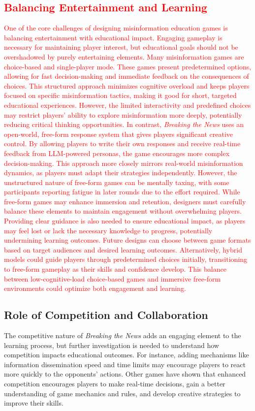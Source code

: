 \textcolor{red}{\subsection{Balancing Entertainment and Learning}
One of the core challenges of designing misinformation education games is balancing entertainment with educational impact. Engaging gameplay is necessary for maintaining player interest, but educational goals should not be overshadowed by purely entertaining elements. Many misinformation games are choice-based and single-player mode\cite{roozenbeek2019fake,camCambridgeGame,harmonysquare,jeon2021chamberbreaker}. These games present predetermined options, allowing for fast decision-making and immediate feedback on the consequences of choices. This structured approach minimizes cognitive overload and keeps players focused on specific misinformation tactics, making it good for short, targeted educational experiences. However, the limited interactivity and predefined choices may restrict players’ ability to explore misinformation more deeply, potentially reducing critical thinking opportunities.
In contrast, \textit{Breaking the News} uses an open-world, free-form response system that gives players significant creative control. By allowing players to write their own responses and receive real-time feedback from LLM-powered personas, the game encourages more complex decision-making. This approach more closely mirrors real-world misinformation dynamics, as players must adapt their strategies independently. However, the unstructured nature of free-form games can be mentally taxing, with some participants reporting fatigue in later rounds due to the effort required. 
While free-form games may enhance immersion and retention, designers must carefully balance these elements to maintain engagement without overwhelming players. Providing clear guidance is also needed to ensure educational impact, as players may feel lost or lack the necessary knowledge to progress, potentially undermining learning outcomes\cite{wells2024doomscroll}.
Future designs can choose between game formats based on target audiences and desired learning outcomes. 
Alternatively, hybrid models could guide players through predetermined choices initially, transitioning to free-form gameplay as their skills and confidence develop. This balance between low-cognitive-load choice-based games and immersive free-form environments could optimize both engagement and learning.}

\subsection{Role of Competition and Collaboration}
The competitive nature of \textit{Breaking the News} adds an engaging element to the learning process, but further investigation is needed to understand how competition impacts educational outcomes. For instance, adding mechanisms like information dissemination speed and time limits may encourage players to react more quickly to the opponents' actions. Other games have shown that enhanced competition encourages players to make real-time decisions, gain a better understanding of game mechanics and rules, and develop creative strategies to improve their skills. 

